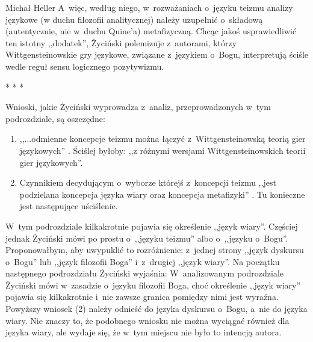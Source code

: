 \begin{artplenv}{Michał Heller}
A~więc, według niego, w~rozważaniach o~języku teizmu analizy językowe (w duchu filozofii analitycznej) należy uzupełnić o~składową (autentycznie, nie w~duchu Quine'a) metafizyczną. Chcąc jakoś usprawiedliwić ten istotny ,,dodatek'', Życiński polemizuje z~autorami, którzy Wittgensteinowskie gry językowe, związane z~językiem o~Bogu, interpretują ściśle wedle reguł sensu logicznego pozytywizmu.


\begin{center}
* * *
\end{center}


Wnioski, jakie Życiński wyprowadza z~analiz, przeprowadzonych w~tym podrozdziale, są oszczędne:

\begin{enumerate}
\item ,,...odmienne koncepcje teizmu można łączyć z~Wittgensteinowską teorią gier językowych''
\parencite[][s.~22]{zycinski_teizm_1985}. %
 Ściślej byłoby: ,,z różnymi wersjami Wittgensteinowskich teorii gier językowych''.
\item Czynnikiem decydującym o~wyborze którejś z~koncepcji teizmu ,,jest podzielana koncepcja języka wiary oraz koncepcja metafizyki''
\parencite[][s.~22]{zycinski_teizm_1985}. %
 Tu konieczne jest następujące uściślenie.
\end{enumerate}
W~tym podrozdziale kilkakrotnie pojawia się określenie ,,język wiary''. Częściej jednak Życiński mówi po prostu o~,,języku teizmu'' albo o~,,języku o~Bogu''. Proponowałbym, aby uwypuklić to rozróżnienie: z~jednej strony ,,język dyskursu o~Bogu'' lub ,,język filozofii Boga'' i~z~drugiej ,,język wiary''. Na początku następnego podrozdziału Życiński wyjaśnia: 
 W~analizowanym podrozdziale Życiński mówi w~zasadzie o~języku filozofii Boga, choć określenie ,,język wiary'' pojawia się kilkakrotnie i~nie zawsze granica pomiędzy nimi jest wyraźna. Powyższy wniosek (2) należy odnieść do języka dyskursu o~Bogu, a~nie do języka wiary. Nie znaczy to, że podobnego wniosku nie można wyciągać również dla języka wiary, ale wydaje się, że w~tym miejscu nie było to intencją autora.


\end{artplenv}
